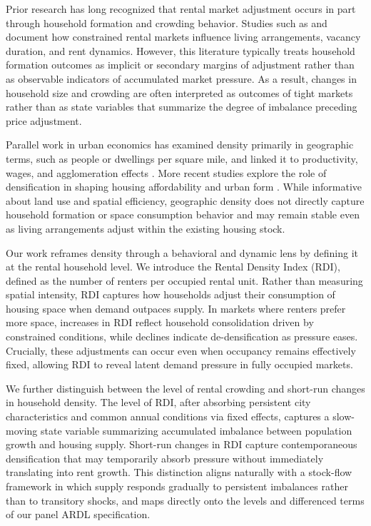 \documentclass[pdflatex,sn-basic]{sn-jnl}%
\theoremstyle{thmstyleone}%
\theoremstyle{thmstyletwo}%
\theoremstyle{thmstylethree}%
\begin{document}
Prior research has long recognized that rental market adjustment occurs in part through
household formation and crowding behavior. Studies such as \cite{gabriel2001rental}
and \cite{sirmans1991determinants} document how constrained rental markets influence
living arrangements, vacancy duration, and rent dynamics. However, this literature
typically treats household formation outcomes as implicit or secondary margins of
adjustment rather than as observable indicators of accumulated market pressure. As a
result, changes in household size and crowding are often interpreted as outcomes of
tight markets rather than as state variables that summarize the degree of imbalance
preceding price adjustment.

Parallel work in urban economics has examined density primarily in geographic terms,
such as people or dwellings per square mile, and linked it to productivity, wages, and
agglomeration effects \cite{glaeser2001cities, duranton2004micro}. More recent studies
explore the role of densification in shaping housing affordability and urban form
\cite{ahlfeldt2019economic, albouy2015driving}. While informative about land use and
spatial efficiency, geographic density does not directly capture household formation or
space consumption behavior and may remain stable even as living arrangements adjust
within the existing housing stock.

Our work reframes density through a behavioral and dynamic lens by defining it at the
rental household level. We introduce the Rental Density Index (RDI), defined as the
number of renters per occupied rental unit. Rather than measuring spatial intensity, RDI
captures how households adjust their consumption of housing space when demand
outpaces supply. In markets where renters prefer more space, increases in RDI reflect
household consolidation driven by constrained conditions, while declines indicate
de-densification as pressure eases. Crucially, these adjustments can occur even when
occupancy remains effectively fixed, allowing RDI to reveal latent demand pressure in
fully occupied markets.

We further distinguish between the level of rental crowding and short-run changes in
household density. The level of RDI, after absorbing persistent city characteristics
and common annual conditions via fixed effects, captures a slow-moving state 
variable summarizing accumulated imbalance between population growth and housing 
supply. Short-run changes in RDI capture contemporaneous densification that may 
temporarily absorb pressure without immediately translating into rent growth. This 
distinction aligns naturally with a stock-flow framework in which supply responds 
gradually to persistent imbalances rather than to transitory shocks, and maps directly 
onto the levels and differenced terms of our panel ARDL specification.
\end{document}
